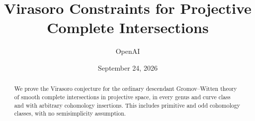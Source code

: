 \documentclass[11pt]{article}
\title{Virasoro Constraints for Projective Complete Intersections}
\author{OpenAI}
\date{September 24, 2026}
\theoremstyle{plain}
\theoremstyle{definition}
\theoremstyle{remark}
\numberwithin{equation}{section}
\begin{document}
\maketitle
\begin{abstract}
We prove the Virasoro conjecture for the ordinary descendant
Gromov--Witten theory of smooth complete intersections in projective space,
in every genus and curve class and with arbitrary cohomology insertions.
This includes primitive and odd cohomology classes, with no semisimplicity
assumption.
\end{abstract}
\tableofcontents
\clearpage










\end{document}

